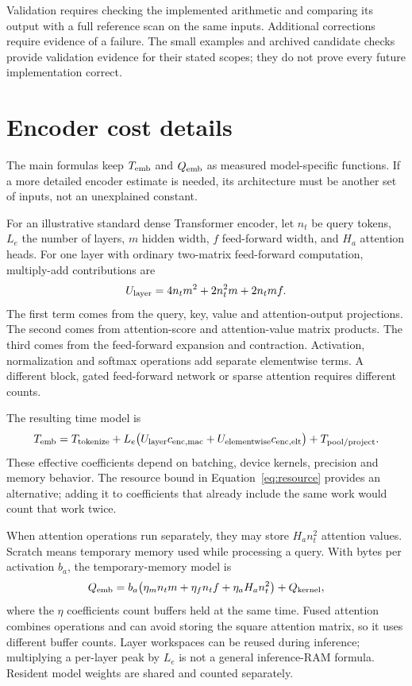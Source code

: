 Validation requires checking the implemented arithmetic and comparing its output with
a full reference scan on the same inputs. Additional corrections require evidence of a failure.
The small examples and archived candidate checks provide validation evidence
for their stated scopes; they do not prove every future implementation correct.

\section{Encoder cost details}
The main formulas keep $T_{\rm emb}$ and $Q_{\rm emb}$ as measured model-specific functions.
If a more detailed encoder estimate is needed, its architecture must be another set of inputs,
not an unexplained constant.

For an illustrative standard dense Transformer encoder, let $n_t$ be query tokens, $L_e$ the
number of layers, $m$ hidden width, $f$ feed-forward width, and $H_a$ attention heads. For one
layer with ordinary two-matrix feed-forward computation, multiply-add contributions are
\begin{equation}
U_{\rm layer}=4n_t m^2+2n_t^2m+2n_tmf.
\end{equation}
The first term comes from the query, key, value and attention-output projections. The second
comes from attention-score and attention-value matrix products. The third comes from the
feed-forward expansion and contraction. Activation, normalization and softmax operations add
separate elementwise terms. A different block, gated feed-forward network or sparse attention
requires different counts.

The resulting time model is
\[
T_{\rm emb}=T_{\rm tokenize}+L_e\big(U_{\rm layer}c_{\rm enc,mac}
 +U_{\rm elementwise}c_{\rm enc,elt}\big)+T_{\rm pool/project}.
\]
These effective coefficients depend on batching, device kernels, precision and memory behavior.
The resource bound in Equation~\eqref{eq:resource} provides an alternative; adding it to
coefficients that already include the same work would count that work twice.

When attention operations run separately, they may store $H_a n_t^2$ attention values.
Scratch means temporary memory used while processing a query. With bytes per activation
$b_a$, the temporary-memory model is
\[
Q_{\rm emb}=b_a\big(\eta_m n_t m+\eta_f n_t f+\eta_a H_a n_t^2\big)+Q_{\rm kernel},
\]
where the $\eta$ coefficients count buffers held at the same time. Fused attention combines
operations and can avoid storing the square attention matrix, so it uses different buffer counts.
Layer workspaces can be reused during inference; multiplying a per-layer peak by $L_e$ is not
a general inference-RAM formula. Resident model weights are shared and counted separately.

